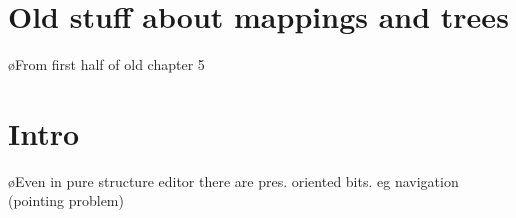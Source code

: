 
%
%
%
%




%																
%																
%																
\section{Old stuff about mappings and trees}

\bl
\o From first half of old chapter 5
\el



%																
%																
%																
\section{Intro}

\bl
\o Even in pure structure editor there are pres. oriented bits. eg navigation (pointing problem)
\el

